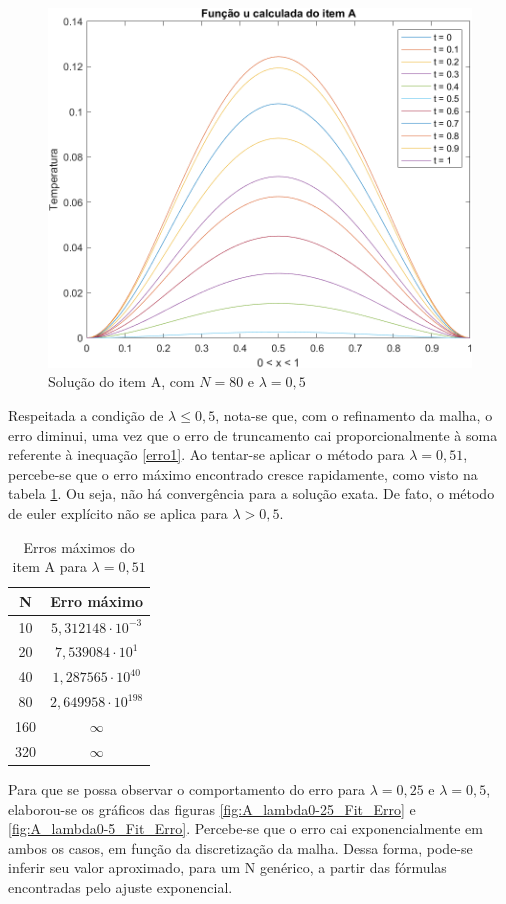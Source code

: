 \documentclass[12pt]{article}
\begin{document}
\begin{spacing}{1.5}
\newpage
\begin{figure}[ht!]
    \centering
    \includegraphics[width=0.6\linewidth]{Primeira_Tarefa/ItemA/itemA_2D.png}
    \caption{Solução do item A, com $N=80$ e $\lambda=0,5$}
    \label{fig:itemA_2D}
\end{figure}

Respeitada a condição de $\lambda \leq 0,5$, nota-se que, com o refinamento da malha, o erro diminui, uma vez que o erro de truncamento cai proporcionalmente à soma referente à inequação \eqref{erro1}. Ao tentar-se aplicar o método para $\lambda = 0,51$, percebe-se que o erro máximo encontrado cresce rapidamente, como visto na tabela \ref{table:A_erro_lambda0-51}. Ou seja, não há convergência para a solução exata. De fato, o método de euler explícito não se aplica para $\lambda > 0,5$.

\begin{table}[ht]
\centering 
\begin{tabular}{c c} 
\hline\hline 
\rule{0pt}{3ex} 
N & Erro máximo\\ [0.5ex] 
\hline 
\rule{0pt}{4ex}
        10  & $5,312148 \cdot 10^{-3}$  \\ 
        20  & $7,539084 \cdot 10^{1}$   \\ 
        40  & $1,287565 \cdot 10^{40}$  \\ 
        80  & $2,649958 \cdot 10^{198}$ \\ 
        160 & $\infty$                  \\ 
        320 & $\infty$                  \\ [1ex]
\hline
\end{tabular}
\caption{Erros máximos do item A para $\lambda = 0,51$} 
\label{table:A_erro_lambda0-51}
\end{table}

Para que se possa observar o comportamento do erro para $\lambda = 0,25$ e $\lambda = 0,5$, elaborou-se os gráficos das figuras \ref{fig:A_lambda0-25_Fit_Erro} e \ref{fig:A_lambda0-5_Fit_Erro}. Percebe-se que o erro cai exponencialmente em ambos os casos, em função da discretização da malha. Dessa forma, pode-se inferir seu valor aproximado, para um N genérico, a partir das fórmulas encontradas pelo ajuste exponencial.


\end{spacing}
\end{document}
